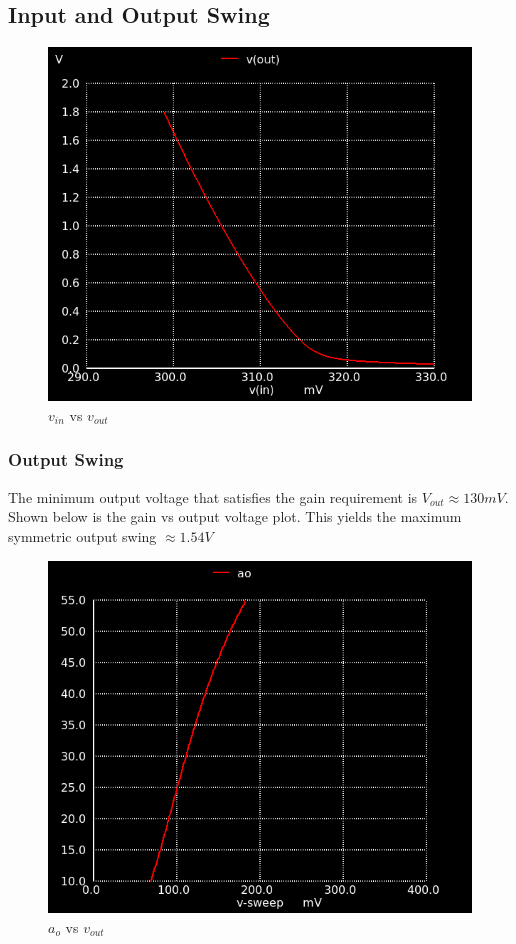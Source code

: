 \documentclass[conference]{IEEEtran}
\begin{document}
\newpage 
\subsection{Input and Output Swing}
\begin{figure}[H]
	\centering 
	\includegraphics[scale=0.4]{vinvout-3.png}
	\caption{$v_{in}$ vs $v_{out}$}
	\label{vinvout-3}	
\end{figure}

\subsubsection{Output Swing}
The minimum output voltage that satisfies the gain requirement is $V_{out} \approx 130mV$. 
Shown below is the gain vs output voltage plot. This yields the maximum symmetric output swing $\approx 1.54V$
\begin{figure}[H]
	\centering 
	\includegraphics[scale=0.4]{ao_vds3.png}
	\caption{$a_{o}$ vs $v_{out}$}
	\label{ao_vds-3}	
\end{figure} 
\end{document}
